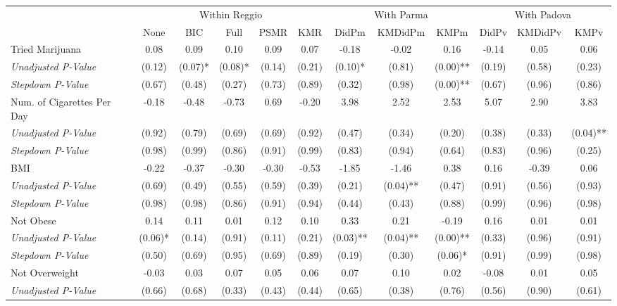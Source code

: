 \begin{tabular}{l c c c c c c c c c c c}
\toprule
& \multicolumn{5}{c}{Within Reggio} & \multicolumn{3}{c}{With Parma} & \multicolumn{3}{c}{With Padova} \\\cmidrule(lr){2-6} \cmidrule(lr){7-9} \cmidrule(lr){10-12}
 & None & BIC & Full & PSMR & KMR & DidPm & KMDidPm & KMPm & DidPv & KMDidPv & KMPv \\
\midrule
Tried Marijuana & 0.08 & 0.09 & 0.10 & 0.09 & 0.07 & -0.18 & -0.02 & 0.16 & -0.14 & 0.05 & 0.06 \\
\quad \textit{Unadjusted P-Value} & (0.12) & (0.07)* & (0.08)* & (0.14) & (0.21) & (0.10)* & (0.81) & (0.00)** & (0.19) & (0.58) & (0.23) \\
\quad \textit{Stepdown P-Value} & (0.67) & (0.48) & (0.27) & (0.73) & (0.89) & (0.32) & (0.98) & (0.00)** & (0.67) & (0.96) & (0.86) \\
Num. of Cigarettes Per Day & -0.18 & -0.48 & -0.73 & 0.69 & -0.20 & 3.98 & 2.52 & 2.53 & 5.07 & 2.90 & 3.83 \\
\quad \textit{Unadjusted P-Value} & (0.92) & (0.79) & (0.69) & (0.69) & (0.92) & (0.47) & (0.34) & (0.20) & (0.38) & (0.33) & (0.04)** \\
\quad \textit{Stepdown P-Value} & (0.98) & (0.99) & (0.86) & (0.91) & (0.99) & (0.83) & (0.94) & (0.64) & (0.83) & (0.96) & (0.25) \\
BMI & -0.22 & -0.37 & -0.30 & -0.30 & -0.53 & -1.85 & -1.46 & 0.38 & 0.16 & -0.39 & 0.06 \\
\quad \textit{Unadjusted P-Value} & (0.69) & (0.49) & (0.55) & (0.59) & (0.39) & (0.21) & (0.04)** & (0.47) & (0.91) & (0.56) & (0.93) \\
\quad \textit{Stepdown P-Value} & (0.98) & (0.98) & (0.86) & (0.91) & (0.94) & (0.44) & (0.43) & (0.88) & (0.99) & (0.96) & (0.98) \\
Not Obese & 0.14 & 0.11 & 0.01 & 0.12 & 0.10 & 0.33 & 0.21 & -0.19 & 0.16 & 0.01 & 0.01 \\
\quad \textit{Unadjusted P-Value} & (0.06)* & (0.14) & (0.91) & (0.11) & (0.21) & (0.03)** & (0.04)** & (0.00)** & (0.33) & (0.96) & (0.91) \\
\quad \textit{Stepdown P-Value} & (0.50) & (0.69) & (0.95) & (0.69) & (0.89) & (0.19) & (0.30) & (0.06)* & (0.91) & (0.99) & (0.98) \\
Not Overweight & -0.03 & 0.03 & 0.07 & 0.05 & 0.06 & 0.07 & 0.10 & 0.02 & -0.08 & 0.01 & 0.05 \\
\quad \textit{Unadjusted P-Value} & (0.66) & (0.68) & (0.33) & (0.43) & (0.44) & (0.65) & (0.38) & (0.76) & (0.56) & (0.90) & (0.61) \\

\end{tabular}
